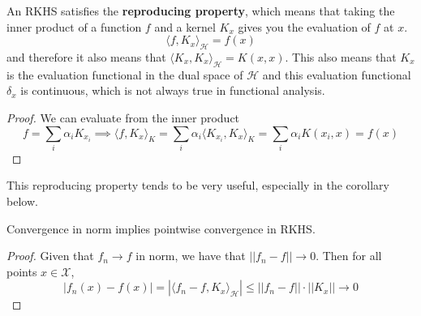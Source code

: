 \documentclass{article}
\begin{document}
  \begin{theorem}
    An RKHS satisfies the \textbf{reproducing property}, which means that taking the inner product of a function $f$ and a kernel $K_x$ gives you the evaluation of $f$ at $x$. 
    \begin{equation}
      \langle f, K_x \rangle_{\mathcal{H}} = f(x)
    \end{equation}
    and therefore it also means that $\langle K_x, K_x \rangle_{\mathcal{H}} = K(x, x)$. This also means that $K_x$ is the evaluation functional in the dual space of $\mathcal{H}$ and this evaluation functional $\delta_x$ is continuous, which is not always true in functional analysis.  
  \end{theorem}
  \begin{proof}
    We can evaluate from the inner product 
    \begin{equation}
      f = \sum_i \alpha_i K_{x_i} \implies \langle f, K_x \rangle_K = \sum_i \alpha_i \langle K_{x_i}, K_x \rangle_K = \sum_i \alpha_i K(x_i, x) = f(x)
    \end{equation}
  \end{proof}

  This reproducing property tends to be very useful, especially in the corollary below. 

  \begin{corollary}
    Convergence in norm implies pointwise convergence in RKHS. 
  \end{corollary}
  \begin{proof}
    Given that $f_n \rightarrow f$ in norm, we have that $||f_n - f|| \rightarrow 0$. Then for all points $x \in \mathcal{X}$, 
    \begin{equation}
      |f_n(x) - f(x)| = |\langle f_n - f, K_x \rangle_{\mathcal{H}}| \leq ||f_n - f|| \cdot ||K_x|| \rightarrow 0
    \end{equation}
  \end{proof}
\end{document}
